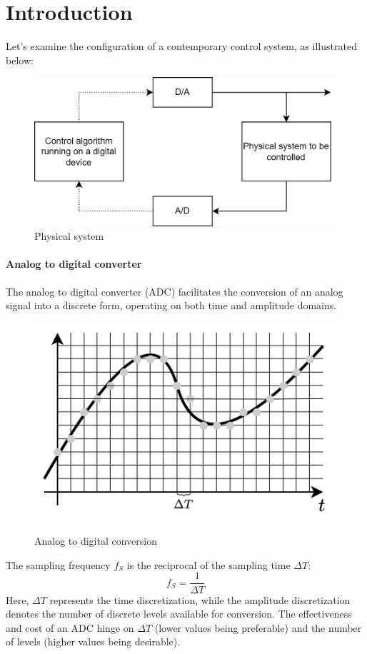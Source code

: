 \section{Introduction}

Let's examine the configuration of a contemporary control system, as illustrated below:
\begin{figure}[H]
    \centering
    \includegraphics[width=0.5\linewidth]{images/discret.png}
    \caption{Physical system}
\end{figure}

\paragraph*{Analog to digital converter}
The analog to digital converter (ADC) facilitates the conversion of an analog signal into a discrete form, operating on both time and amplitude domains.
\begin{figure}[H]
    \centering
    \includegraphics[width=0.5\linewidth]{images/discret1.png}
    \caption{Analog to digital conversion}
\end{figure}
The sampling frequency $f_S$ is the reciprocal of the sampling time $\Delta T$:
\[f_S=\dfrac{1}{\Delta T}\]
Here, $\Delta T$ represents the time discretization, while the amplitude discretization denotes the number of discrete levels available for conversion.
The effectiveness and cost of an ADC hinge on  $\Delta T$  (lower values being preferable) and the number of levels (higher values being desirable).

